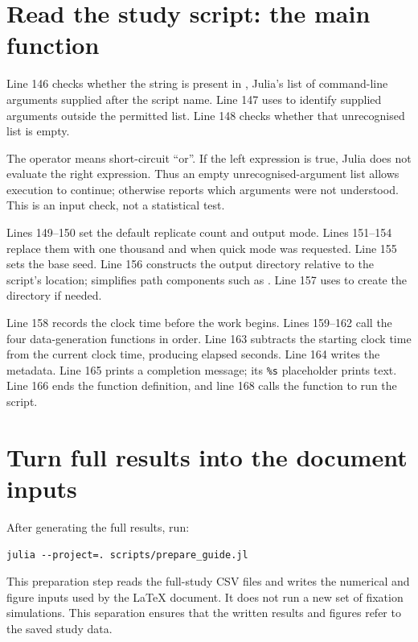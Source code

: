 \section{Read the study script: the main function}



Line 146 checks whether the string  is present in
, Julia's list of command-line arguments supplied after the
script name. Line 147 uses  to identify supplied arguments
outside the permitted list. Line 148 checks whether that unrecognised list
is empty.

The operator \code{||} means short-circuit ``or''. If the left expression
is true, Julia does not evaluate the right expression. Thus an empty
unrecognised-argument list allows execution to continue; otherwise
 reports which arguments were not understood. This is an input
check, not a statistical test.

Lines 149--150 set the default replicate count and output mode. Lines
151--154 replace them with one thousand and  when quick
mode was requested. Line 155 sets the base seed. Line 156 constructs the
output directory relative to the script's location; 
simplifies path components such as . Line 157 uses 
to create the directory if needed.

Line 158 records the clock time before the work begins. Lines 159--162 call
the four data-generation functions in order. Line 163 subtracts the starting
clock time from the current clock time, producing elapsed seconds. Line 164
writes the metadata. Line 165 prints a completion message; its \verb|%s|
placeholder prints text. Line 166 ends the function definition, and line
168 calls the function to run the script.

\section{Turn full results into the document inputs}

After generating the full results, run:
\begin{lstlisting}[language={},numbers=none]
julia --project=. scripts/prepare_guide.jl
\end{lstlisting}
This preparation step reads the full-study CSV files and writes the numerical
and figure inputs used by the LaTeX document. It does not run a new set of
fixation simulations. This separation ensures that the written results and
figures refer to the saved study data.

